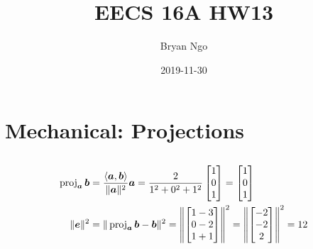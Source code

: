 \documentclass[]{article}
\title{EECS 16A HW13}
\author{Bryan Ngo}
\date{2019-11-30}
\renewcommand{\vec}[1]{\bm{#1}}
\newcommand{\proj}[1]{\operatorname{proj} #1}
\newcommand{\iprod}[2]{\left\langle #1, #2 \right\rangle}
\begin{document}
\maketitle

\section{Mechanical: Projections}

\subsection{}

\begin{align}
	\proj_{\vec{a}}{\vec{b}} &= \frac{\iprod{\vec{a}}{\vec{b}}}{\|\vec{a}\|^2} \vec{a} = \frac{2}{1^2 + 0^2 + 1^2} \begin{bmatrix}
	1 \\
	0 \\
	1
	\end{bmatrix} = \begin{bmatrix}
	1 \\
	0 \\
	1
	\end{bmatrix} \\
	\|\vec{e}\|^2 &= \|\proj_{\vec{a}}{\vec{b}} - \vec{b}\|^2 = \left\|\begin{bmatrix}
	1 - 3 \\
	0 - 2 \\
	1 + 1
	\end{bmatrix}\right\|^2 = \left\|\begin{bmatrix}
	-2 \\
	-2 \\
	2
	\end{bmatrix}\right\|^2 = 12
\end{align}

\subsection{}
\end{document}
